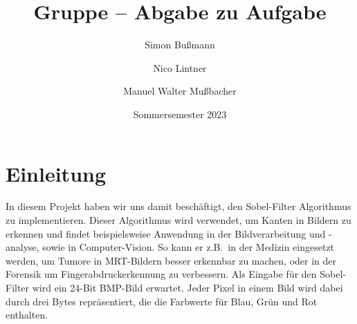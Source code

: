\documentclass[course=erap]{aspdoc}
\author{Simon Bußmann \and Nico Lintner \and Manuel Walter Mußbacher}
\date{Sommersemester 2023}
\title{Gruppe \theGroup{} -- Abgabe zu Aufgabe \theNumber}
\begin{document}
\maketitle

\section{Einleitung}
\label{sec:einleitung}
In diesem Projekt haben wir uns damit beschäftigt, den Sobel-Filter Algorithmus zu implementieren.
Dieser Algorithmus wird verwendet, um Kanten in Bildern zu erkennen und findet beispielsweise Anwendung in der Bildverarbeitung und -analyse, sowie in Computer-Vision.
So kann er z.B.\ in der Medizin eingesetzt werden, um Tumore in MRT-Bildern besser erkennbar zu machen\cite{7002427},
oder in der Forensik um Fingerabdruckerkennung zu verbessern.\cite{6900702}
Als Eingabe für den Sobel-Filter wird ein 24-Bit BMP-Bild erwartet.
Jeder Pixel in einem Bild wird dabei durch drei Bytes repräsentiert, die die Farbwerte für Blau, Grün und Rot enthalten.
\end{document}
